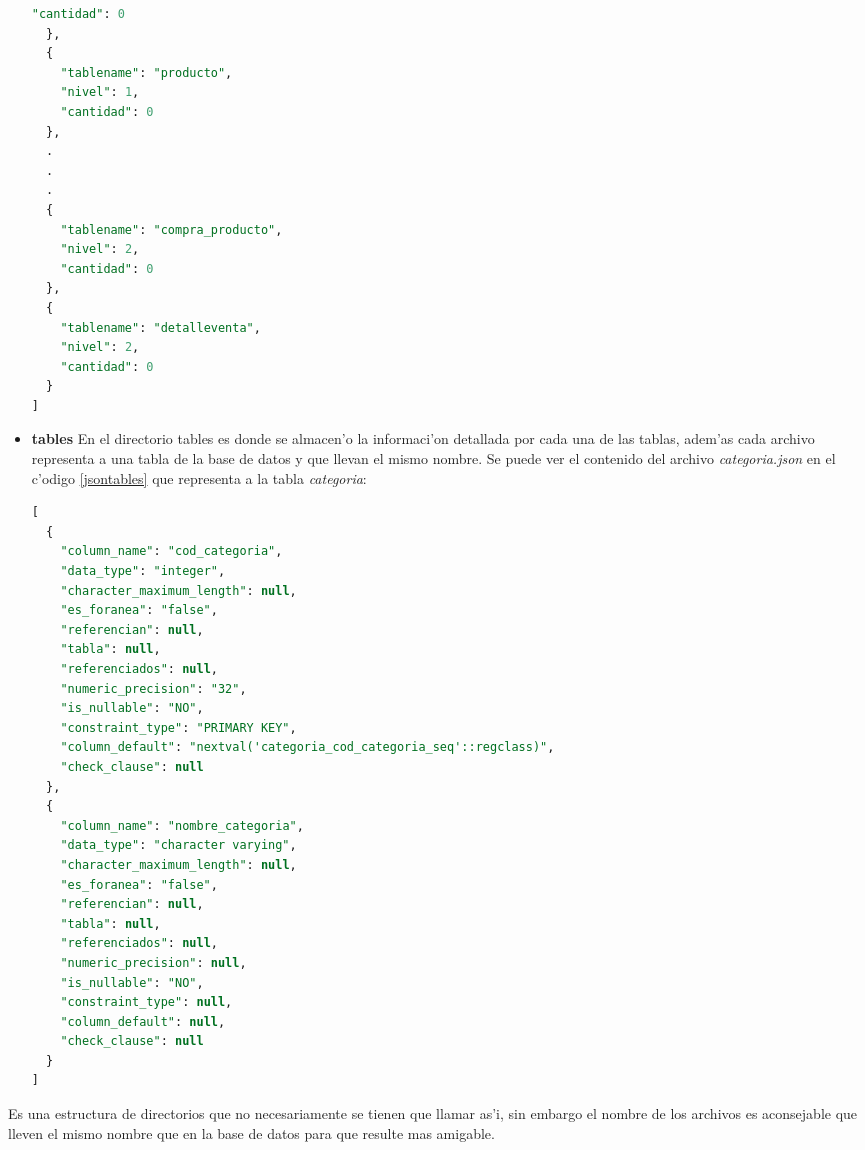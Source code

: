 \begin{itemize}
\begin{lstlisting}[caption={Ejemplo archivo control},label={jsonmodelo},language=sql]
    "cantidad": 0
  },
  {
    "tablename": "producto",
    "nivel": 1,
    "cantidad": 0
  },
  .
  .
  .
  {
    "tablename": "compra_producto",
    "nivel": 2,
    "cantidad": 0
  },
  {
    "tablename": "detalleventa",
    "nivel": 2,
    "cantidad": 0
  }
]
\end{lstlisting}  
\item \textbf{tables} En el directorio tables es donde se almacen'o la informaci'on detallada por cada una de las tablas, adem'as cada archivo representa a una tabla de la base de datos y que llevan el mismo nombre. Se puede ver el contenido del archivo \textit{categoria.json} en el c'odigo \ref{jsontables} que representa a la tabla \textit{categoria}:

\begin{lstlisting}[caption={Ejemplo archivo control},label={jsontables},language=sql]
[
  {
    "column_name": "cod_categoria",
    "data_type": "integer",
    "character_maximum_length": null,
    "es_foranea": "false",
    "referencian": null,
    "tabla": null,
    "referenciados": null,
    "numeric_precision": "32",
    "is_nullable": "NO",
    "constraint_type": "PRIMARY KEY",
    "column_default": "nextval('categoria_cod_categoria_seq'::regclass)",
    "check_clause": null
  },
  {
    "column_name": "nombre_categoria",
    "data_type": "character varying",
    "character_maximum_length": null,
    "es_foranea": "false",
    "referencian": null,
    "tabla": null,
    "referenciados": null,
    "numeric_precision": null,
    "is_nullable": "NO",
    "constraint_type": null,
    "column_default": null,
    "check_clause": null
  }
]
\end{lstlisting} 
\end{itemize}

Es una estructura de directorios que no necesariamente se tienen que llamar as'i, sin embargo el nombre de los archivos es aconsejable que lleven el mismo nombre que en la base de datos para que resulte mas amigable.
